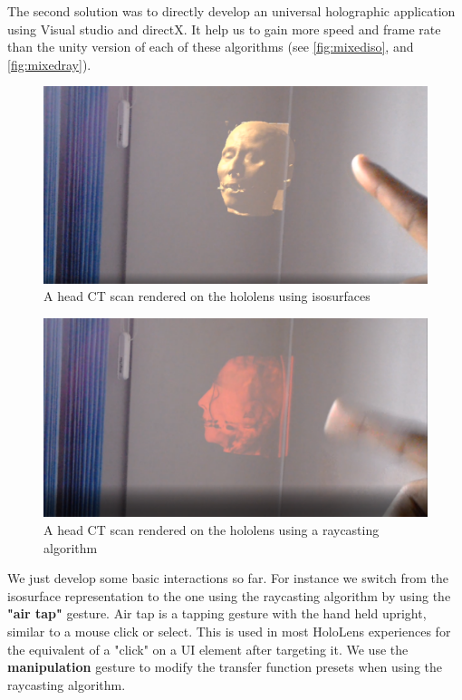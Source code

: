 The second solution was to directly develop an universal holographic application using Visual studio and directX. It help us to gain more speed and frame rate than the unity version of each of these algorithms (see \autoref{fig:mixediso}, and \autoref{fig:mixedray}). 

\begin{figure}
\centering
\includegraphics [width=\textwidth]{Figures/mixediso}
\caption{A head CT scan rendered on the hololens using isosurfaces }
\label{fig:mixediso}
\end{figure}


\begin{figure}
\centering
\includegraphics [width=\textwidth]{Figures/mixedray}
\caption{A head CT scan rendered on the hololens using a raycasting algorithm }
\label{fig:mixedray}
\end{figure}

We just develop some basic interactions so far. For instance we switch from the isosurface representation to the one using the raycasting algorithm by using the \textbf{"air tap"} gesture. Air tap is a tapping gesture with the hand held upright, similar to a mouse click or select. This is used in most HoloLens experiences for the equivalent of a "click" on a UI element after targeting it.  We use the \textbf{manipulation} gesture to modify the transfer function presets when using the raycasting algorithm.

